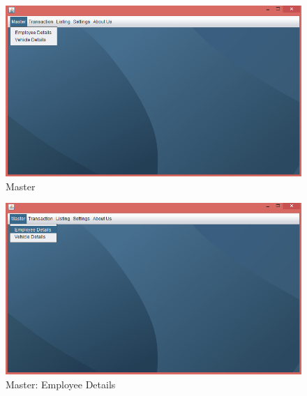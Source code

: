 \begin{figure}[ht]
\begin{center}
\includegraphics[scale=0.5]{images/image15.png}
\end{center}
\caption{Master}
\label{Master}
\end{figure}

\begin{figure}[ht]
\begin{center}
\includegraphics[scale=0.5]{images/image16.png}
\end{center}
\caption{Master: Employee Details}
\label{Master: Employee Details}
\end{figure}

